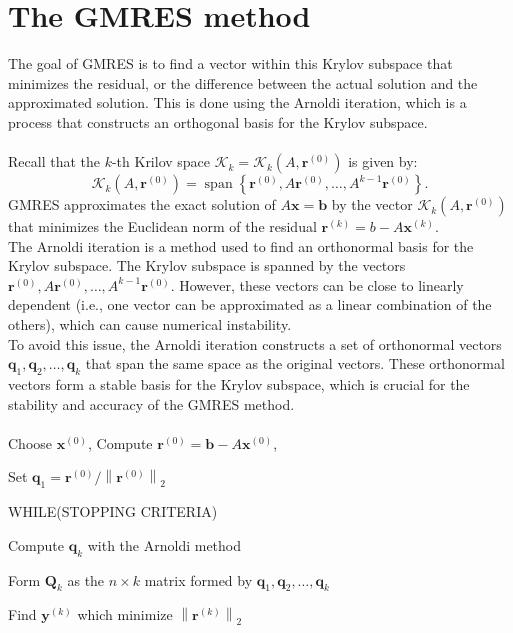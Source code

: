 \documentclass[11pt]{book}
\begin{document}
\section*{The GMRES method}
The goal of GMRES is to find a vector within this Krylov subspace that minimizes the residual, or the difference between the actual solution and the approximated solution. This is done using the Arnoldi iteration, which is a process that constructs an orthogonal basis for the Krylov subspace.\\ \\
Recall that the $k$-th Krilov space $\mathscr{K}_{k}=\mathscr{K}_{k}\left(A, \mathbf{r}^{(0)}\right)$ is given by:
$$\mathscr{K}_{k}\left(A, \mathbf{r}^{(0)}\right)=\operatorname{span}\left\{\mathbf{r}^{(0)}, A \mathbf{r}^{(0)}, \ldots, A^{k-1} \mathbf{r}^{(0)}\right\}.$$
GMRES approximates the exact solution of $A \mathbf{x}=\mathbf{b}$ by the vector $\mathscr{K}_{k}\left(A, \mathbf{r}^{(0)}\right)$ that minimizes the Euclidean norm of the residual $\mathbf{r}^{(k)}=b-A \mathbf{x}^{(k)}$. \\
The Arnoldi iteration is a method used to find an orthonormal basis for the Krylov subspace. The Krylov subspace is spanned by the vectors $\mathbf{r}^{(0)}, A \mathbf{r}^{(0)}, \ldots, A^{k-1} \mathbf{r}^{(0)}$. However, these vectors can be close to linearly dependent (i.e., one vector can be approximated as a linear combination of the others), which can cause numerical instability.\\ 
To avoid this issue, the Arnoldi iteration constructs a set of orthonormal vectors $\mathbf{q}_{1}, \mathbf{q}_{2}, \ldots, \mathbf{q}_{k}$ that span the same space as the original vectors. These orthonormal vectors form a stable basis for the Krylov subspace, which is crucial for the stability and accuracy of the GMRES method.\\ \\
Choose $\mathbf{x}^{(0)}$, Compute $\mathbf{r}^{(0)}=\mathbf{b}-A \mathbf{x}^{(0)}$,

Set $\mathbf{q}_{1}=\mathbf{r}^{(0)} /\left\|\mathbf{r}^{(0)}\right\|_{2}$

WHILE(STOPPING CRITERIA)

Compute $\mathbf{q}_{k}$ with the Arnoldi method

Form $\mathbf{Q}_{k}$ as the $n \times k$ matrix formed by $\mathbf{q}_{1}, \mathbf{q}_{2}, \ldots, \mathbf{q}_{k}$

Find $\mathbf{y}^{(k)}$ which minimize $\left\|\mathbf{r}^{(k)}\right\|_{2}$
\end{document}

